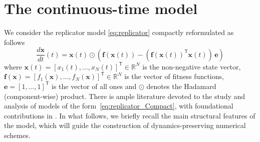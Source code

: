 \documentclass[11pt,letterpaper]{article}
\theoremstyle{remark}
\begin{document}
\section{The continuous-time model}\label{sec:Model}
We consider the replicator model \eqref{eq:replicator} compactly reformulated as follows
\begin{equation}\label{eq:replicator_Compact}
  \dfrac{d\bm{x}}{dt}(t) = \bm{x}(t) \odot \left( \bm{f}(\bm{x}(t)) - \left( \bm{f}(\bm{x}(t))^\mathsf{T}  \bm{x}(t)\right)  \, \bm{e} \right)
\end{equation}
where $\bm{x}(t) = [x_1(t),\dots,x_N(t)]^\mathsf{T} \in \mathbb{R}^N$  is the non-negative state vector, $\bm{f}(\bm{x}) = [f_1(\bm{x}),\dots,f_N(\bm{x})]^\mathsf{T} \in \mathbb{R}^N$ is the vector of fitness functions, $\bm{e} = [1,\dots,1]^\mathsf{T}$ is the vector of all ones and $\odot$ denotes the Hadamard (component-wise) product. There is ample literature devoted to the study and analysis of models of the form~\eqref{eq:replicator_Compact}, with foundational contributions in \cite{Sigmund1986,SCHUSTER}. In what follows, we briefly recall the main structural features of the model, which will guide the construction of dynamics-preserving numerical schemes.
\end{document}
